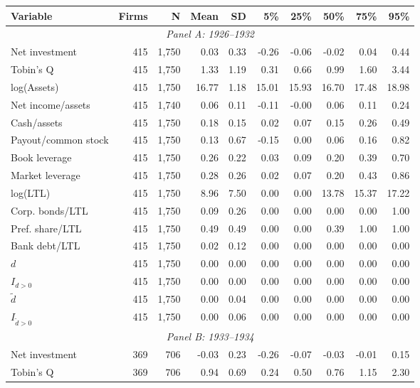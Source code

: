 \begin{threeparttable}
\begin{tabular}{lrrrrrrrrr}
\toprule
Variable & Firms & N & Mean & SD & 5\% & 25\% & 50\% & 75\% & 95\% \\
\midrule
\multicolumn{10}{c}{\textit{Panel A: 1926--1932}} \\
\midrule
Net investment & 415 & 1,750 & 0.03 & 0.33 & -0.26 & -0.06 & -0.02 & 0.04 & 0.44 \\
Tobin's Q & 415 & 1,750 & 1.33 & 1.19 & 0.31 & 0.66 & 0.99 & 1.60 & 3.44 \\
log(Assets) & 415 & 1,750 & 16.77 & 1.18 & 15.01 & 15.93 & 16.70 & 17.48 & 18.98 \\
Net income/assets & 415 & 1,740 & 0.06 & 0.11 & -0.11 & -0.00 & 0.06 & 0.11 & 0.24 \\
Cash/assets & 415 & 1,750 & 0.18 & 0.15 & 0.02 & 0.07 & 0.15 & 0.26 & 0.49 \\
Payout/common stock & 415 & 1,750 & 0.13 & 0.67 & -0.15 & 0.00 & 0.06 & 0.16 & 0.82 \\
Book leverage & 415 & 1,750 & 0.26 & 0.22 & 0.03 & 0.09 & 0.20 & 0.39 & 0.70 \\
Market leverage & 415 & 1,750 & 0.28 & 0.26 & 0.02 & 0.07 & 0.20 & 0.43 & 0.86 \\
log(LTL) & 415 & 1,750 & 8.96 & 7.50 & 0.00 & 0.00 & 13.78 & 15.37 & 17.22 \\
Corp. bonds/LTL & 415 & 1,750 & 0.09 & 0.26 & 0.00 & 0.00 & 0.00 & 0.00 & 1.00 \\
Pref. share/LTL & 415 & 1,750 & 0.49 & 0.49 & 0.00 & 0.00 & 0.39 & 1.00 & 1.00 \\
Bank debt/LTL & 415 & 1,750 & 0.02 & 0.12 & 0.00 & 0.00 & 0.00 & 0.00 & 0.00 \\
\ensuremath{d} & 415 & 1,750 & 0.00 & 0.00 & 0.00 & 0.00 & 0.00 & 0.00 & 0.00 \\
\ensuremath{I_{d>0}} & 415 & 1,750 & 0.00 & 0.00 & 0.00 & 0.00 & 0.00 & 0.00 & 0.00 \\
\ensuremath{\tilde{d}} & 415 & 1,750 & 0.00 & 0.04 & 0.00 & 0.00 & 0.00 & 0.00 & 0.00 \\
\ensuremath{I_{\tilde{d}>0}} & 415 & 1,750 & 0.00 & 0.06 & 0.00 & 0.00 & 0.00 & 0.00 & 0.00 \\
\midrule
\multicolumn{10}{c}{\textit{Panel B: 1933--1934}} \\
\midrule
Net investment & 369 & 706 & -0.03 & 0.23 & -0.26 & -0.07 & -0.03 & -0.01 & 0.15 \\
Tobin's Q & 369 & 706 & 0.94 & 0.69 & 0.24 & 0.50 & 0.76 & 1.15 & 2.30 \\

\end{tabular}
\end{threeparttable}
